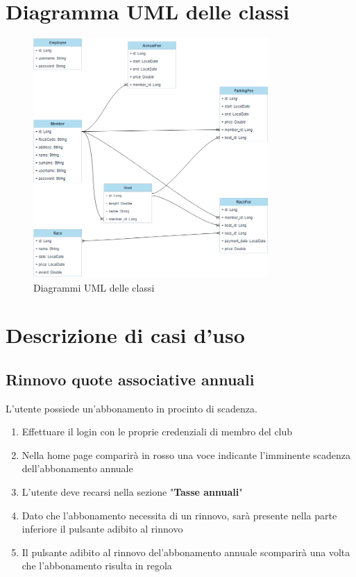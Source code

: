 \documentclass{report}
\begin{document}
    
    


    \chapter{Diagramma UML delle classi} %
    \label{cha:Diagramma UML delle classi}

    \begin{figure}[h!]
      \begin{center}
        \includegraphics[width=0.80\textwidth]{./images/uml_classi.png}
      \end{center}
      \caption{Diagrammi UML delle classi}
      \label{fig:class_uml_figure}
    \end{figure}
      


    \chapter{Descrizione di casi d'uso} %
    \label{cha:Descrizione di casi d'uso}
    \section{Rinnovo quote associative annuali}
    L'utente possiede un'abbonamento in procinto di scadenza.
    \begin{enumerate}
      \item Effettuare il login con le proprie credenziali di membro del club
      \item Nella home page comparirà in rosso una voce indicante l'imminente scadenza dell'abbonamento annuale
      \item L'utente deve recarsi nella sezione "\textbf{Tasse annuali}"
      \item Dato che l'abbonamento necessita di un rinnovo, sarà presente nella parte inferiore il pulsante adibito al rinnovo
      \item Il pulsante adibito al rinnovo del'abbonamento annuale scomparirà una volta che l'abbonamento risulta in regola
    \end{enumerate}
\end{document}
